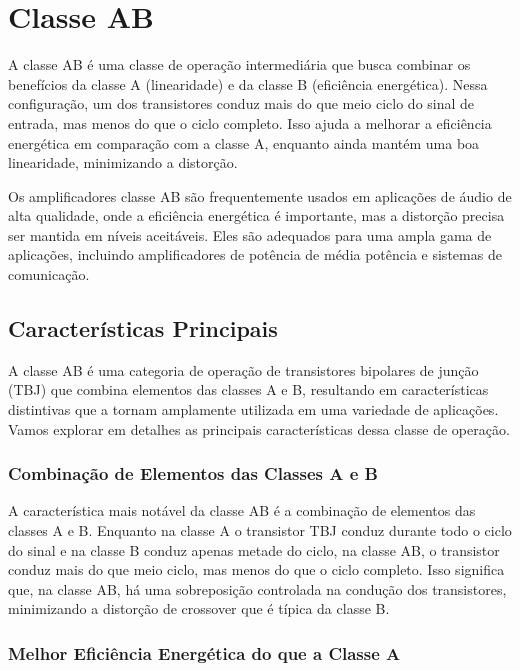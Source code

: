 \section{Classe AB}

A classe AB é uma classe de operação intermediária que busca combinar os benefícios da classe A (linearidade) e da classe B (eficiência energética). Nessa configuração, um dos transistores conduz mais do que meio ciclo do sinal de entrada, mas menos do que o ciclo completo. Isso ajuda a melhorar a eficiência energética em comparação com a classe A, enquanto ainda mantém uma boa linearidade, minimizando a distorção.

Os amplificadores classe AB são frequentemente usados em aplicações de áudio de alta qualidade, onde a eficiência energética é importante, mas a distorção precisa ser mantida em níveis aceitáveis. Eles são adequados para uma ampla gama de aplicações, incluindo amplificadores de potência de média potência e sistemas de comunicação.

\subsection{Características Principais}

A classe AB é uma categoria de operação de transistores bipolares de junção (TBJ) que combina elementos das classes A e B, resultando em características distintivas que a tornam amplamente utilizada em uma variedade de aplicações. Vamos explorar em detalhes as principais características dessa classe de operação.

\subsubsection{Combinação de Elementos das Classes A e B}

A característica mais notável da classe AB é a combinação de elementos das classes A e B. Enquanto na classe A o transistor TBJ conduz durante todo o ciclo do sinal e na classe B conduz apenas metade do ciclo, na classe AB, o transistor conduz mais do que meio ciclo, mas menos do que o ciclo completo. Isso significa que, na classe AB, há uma sobreposição controlada na condução dos transistores, minimizando a distorção de crossover que é típica da classe B.

\subsubsection{Melhor Eficiência Energética do que a Classe A}

